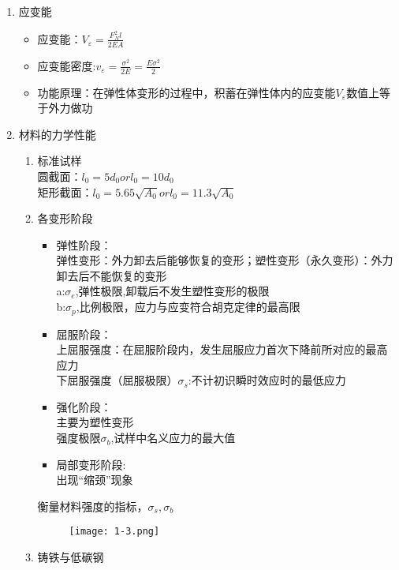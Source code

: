 \documentclass[12pt]{ctexbook}
\theoremstyle{plain}
\begin{document}
\begin{enumerate}[label={\arabic*}]
\item 应变能
\begin{itemize}
    \item 应变能：$V_\varepsilon =\frac{F_N^2l}{2EA}$
    \item 应变能密度:$v_\varepsilon=\frac{\sigma ^2}{2E}=\frac{E\sigma ^2}{2}$
    \item 功能原理：在弹性体变形的过程中，积蓄在弹性体内的应变能$V_\varepsilon $数值上等于外力做功
\end{itemize}
\item 材料的力学性能
\begin{enumerate}
    \item 标准试样\\
    圆截面：$l_0=5d_0 or l_0=10d_0$\\
    矩形截面：$l_0=5.65\sqrt{A_0} or l_0=11.3\sqrt{A_0}$
    \item 各变形阶段
    \begin{itemize}
        \item 弹性阶段：\\
        弹性变形：外力卸去后能够恢复的变形；塑性变形（永久变形）：外力卸去后不能恢复的变形\\
        a:$\sigma_e$,弹性极限,卸载后不发生塑性变形的极限\\
        b:$\sigma_p$,比例极限，应力与应变符合胡克定律的最高限\\
        \item 屈服阶段：\\
        上屈服强度：在屈服阶段内，发生屈服应力首次下降前所对应的最高应力\\
        下屈服强度（屈服极限）$\sigma_s$:不计初识瞬时效应时的最低应力\\
        \item 强化阶段：\\
        主要为塑性变形\\
        强度极限$\sigma_b$,试样中名义应力的最大值\\
        \item 局部变形阶段:\\
        出现“缩颈”现象
    \end{itemize}
    衡量材料强度的指标，$\sigma_s,\sigma_b$
    \begin{figure}[htbp]
        \centering
        \texttt{[image: 1-3.png]}
      \end{figure}
    \item 铸铁与低碳钢
    \begin{figure}[htbp]
        \centering

\end{figure}
\end{enumerate}
\end{enumerate}
\end{document}
